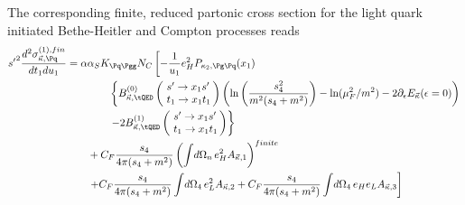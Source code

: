 The corresponding finite, reduced partonic cross section for the light quark initiated Bethe-Heitler and Compton processes reads
\begin{align}
{s'}^2\frac{d^2\sigma_{\vec \kappa,\Pq}^{(1),fin}}{dt_1du_1} &=\alpha\alpha_SK_{\Pq\Pgg}N_C\left[-\frac 1 {u_1}e_H^2P_{\kappa_2,\Pg\Pq}(x_1)\right. \nonumber\\
 &\hspace{40pt}\left\{B^{(0)}_{\vec \kappa,\tQED}\left(\!\begin{array}{l}s'\rightarrow x_1s'\\t_1\rightarrow x_1 t_1\end{array}\!\!\right) \left(\ln\left(\frac{s_4^2}{m^2(s_4+m^2)}\right)-\ln(\mu_F^2/m^2)-2\partial_\epsilon E_{\vec \kappa}(\epsilon=0)\right)\right. \nonumber\\
 &\hspace{40pt}\left.-2 B^{(1)}_{\vec \kappa,\tQED}\left(\!\begin{array}{l}s'\rightarrow x_1s'\\t_1\rightarrow x_1 t_1\end{array}\!\!\right)\right\} \nonumber\\
 &\hspace{20pt}+C_F\frac{s_4}{4\pi(s_4+m^2)}\left(\int\!d\Omega_n\,e_H^2A_{\vec \kappa,1}\right)^{finite} \nonumber\\
 &\hspace{20pt}\left.+C_F\frac{s_4}{4\pi(s_4+m^2)}\int\!d\Omega_4\,e_L^2A_{\vec \kappa,2} +C_F\frac{s_4}{4\pi(s_4+m^2)}\int\!d\Omega_4\,e_H e_L A_{\vec \kappa,3} \right]
\end{align}
